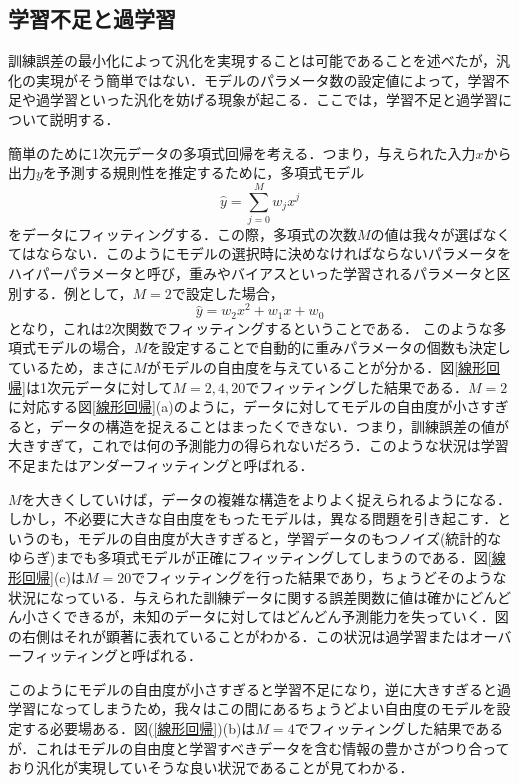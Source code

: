 \documentclass[a4paper,11pt]{jsreport}
\begin{document}
\subsection{学習不足と過学習}
訓練誤差の最小化によって汎化を実現することは可能であることを述べたが，汎化の実現がそう簡単ではない．モデルのパラメータ数の設定値によって，学習不足や過学習といった汎化を妨げる現象が起こる．ここでは，学習不足と過学習について説明する．\par
簡単のために1次元データの多項式回帰を考える．つまり，与えられた入力$x$から出力$y$を予測する規則性を推定するために，多項式モデル
\begin{equation}
  \hat{y} = \sum_{j=0}^M w_j x^j
\end{equation}
をデータにフィッティングする．この際，多項式の次数$M$の値は我々が選ばなくてはならない．このようにモデルの選択時に決めなければならないパラメータをハイパーパラメータと呼び，重みやバイアスといった学習されるパラメータと区別する．例として，$M=2$で設定した場合，
\begin{equation}
  \hat{y} = w_2 x^2 + w_1 x + w_0  
\end{equation}
となり，これは2次関数でフィッティングするということである．
このような多項式モデルの場合，$M$を設定することで自動的に重みパラメータの個数も決定しているため，まさに$M$がモデルの自由度を与えていることが分かる．図\ref{線形回帰}は1次元データに対して$M=2, 4, 20$でフィッティングした結果である．$M=2$に対応する図\ref{線形回帰}(a)のように，データに対してモデルの自由度が小さすぎると，データの構造を捉えることはまったくできない．つまり，訓練誤差の値が大きすぎて，これでは何の予測能力の得られないだろう．このような状況は学習不足またはアンダーフィッティングと呼ばれる．\par
$M$を大きくしていけば，データの複雑な構造をよりよく捉えられるようになる．しかし，不必要に大きな自由度をもったモデルは，異なる問題を引き起こす．というのも，モデルの自由度が大きすぎると，学習データのもつノイズ(統計的なゆらぎ)までも多項式モデルが正確にフィッティングしてしまうのである．図\ref{線形回帰}(c)は$M=20$でフィッティングを行った結果であり，ちょうどそのような状況になっている．与えられた訓練データに関する誤差関数に値は確かにどんどん小さくできるが，未知のデータに対してはどんどん予測能力を失っていく．図の右側はそれが顕著に表れていることがわかる．この状況は過学習またはオーバーフィッティングと呼ばれる．\par
このようにモデルの自由度が小さすぎると学習不足になり，逆に大きすぎると過学習になってしまうため，我々はこの間にあるちょうどよい自由度のモデルを設定する必要場ある．図(\ref{線形回帰})(b)は$M=4$でフィッティングした結果であるが．これはモデルの自由度と学習すべきデータを含む情報の豊かさがつり合っており汎化が実現していそうな良い状況であることが見てわかる．\par
\end{document}
